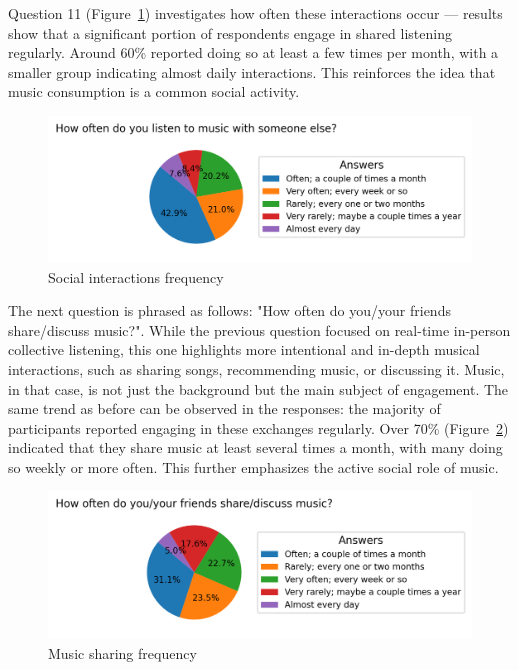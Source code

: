 Question 11 (Figure~\ref{fig:listentogetherfreq}) investigates how often these interactions occur —
results show that a significant portion of respondents engage in shared listening regularly.
Around 60\% reported doing so at least a few times per month,
with a smaller group indicating almost daily interactions.
This reinforces the idea that music consumption is a common social activity.


\begin{figure}[htbp]
    \centering
    \includegraphics[width=1\textwidth, keepaspectratio]{charts/listen together freq.png}
    \caption{Social interactions frequency}
    \label{fig:listentogetherfreq}
\end{figure}

The next question is phrased as follows: "How often do you/your friends share/discuss music?".
While the previous question focused on real-time in-person collective listening,
this one highlights more intentional and in-depth musical interactions, such as sharing songs,
recommending music, or discussing it. Music, in that case, is not just the background but the main subject of engagement.
The same trend as before can be observed in the responses: the majority of participants reported engaging in these exchanges regularly.
Over 70\% (Figure~\ref{fig:sharefreq}) indicated that they share music at least several times a month, with many doing so weekly or more often.
This further emphasizes the active social role of music.

\begin{figure}[htbp]
    \centering
    \includegraphics[width=1\textwidth, keepaspectratio]{charts/share freq.png}
    \caption{Music sharing frequency}
    \label{fig:sharefreq}
\end{figure}

